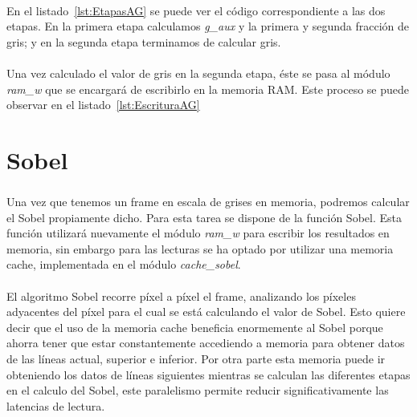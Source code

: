 \documentclass[a4paper,12pt,titlepage,final]{book}
\begin{document}
\paragraph{}
En el listado~\ref{lst:EtapasAG} se puede ver el código correspondiente a las dos etapas. En la primera etapa calculamos \textit{g\_aux} y la primera y segunda fracción de gris; y en la segunda etapa terminamos de calcular gris.



\paragraph{}
Una vez calculado el valor de gris en la segunda etapa, éste se pasa al módulo \textit{ram\_w} que se encargará de escribirlo en la memoria RAM. Este proceso se puede observar en el listado~\ref{lst:EscrituraAG}



\section{Sobel}
\subsubsection*{}
\paragraph{}
Una vez que tenemos un frame en escala de grises en memoria, podremos calcular el Sobel propiamente dicho. Para esta tarea se dispone de la función Sobel. Esta función utilizará nuevamente el módulo \textit{ram\_w} para escribir los resultados en memoria, sin embargo para las lecturas se ha optado por utilizar una memoria cache, implementada en el módulo \textit{cache\_sobel}.

\paragraph{}
El algoritmo Sobel recorre píxel a píxel el frame, analizando los píxeles adyacentes del píxel para el cual se está calculando el valor de Sobel. Esto quiere decir que el uso de la memoria cache beneficia enormemente al Sobel porque ahorra tener que estar constantemente accediendo a memoria para obtener datos de las líneas actual, superior e inferior. Por otra parte esta memoria puede ir obteniendo los datos de líneas siguientes mientras se calculan las diferentes etapas en el calculo del Sobel, este paralelismo permite reducir significativamente las latencias de lectura.
\end{document}

